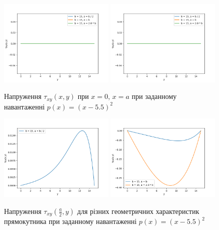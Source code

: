\begin{figure}[H]
    \begin{center}
        \includegraphics[width=0.49\textwidth, scale=1]{images/results/static_1/tau(0,y).png}
        \includegraphics[width=0.49\textwidth, scale=1]{images/results/static_1/tau(a,y).png}
        \caption{Напруження $\tau_{xy}(x, y)$ при $x=0$, $x=a$ при заданному навантаженні $p(x) = (x - 5.5)^2$}\label{static_1_tau(0/a,y)}
    \end{center}
\end{figure}
\begin{figure}[H]
    \begin{center}
        \includegraphics[width=0.49\textwidth, scale=1]{images/results/static_1/tau(a:2,y)1.png}
        \includegraphics[width=0.49\textwidth, scale=1]{images/results/static_1/tau(a:2,y)2.png}
        \caption{Напруження $\tau_{xy}(\frac{a}{2}, y)$ для різних геометричних характеристик прямокутника при заданному навантаженні $p(x) = (x - 5.5)^2$}\label{static_1_tau(a:2,y)}
    \end{center}
\end{figure}


